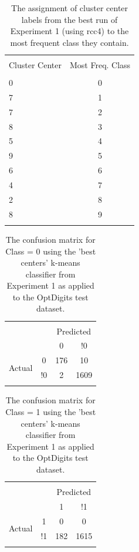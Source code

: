 \documentclass[12pt]{article}
\begin{document}
\begin{table} \centering 
  \caption{The assignment of cluster center labels from the best run of Experiment 1 (using rcc4) to the most frequent class they contain.} 
  \label{tab:a2} 
\begin{tabular}{lc} \\
[-1.8ex] \hline \hline \\[-1.8ex] 
 Cluster Center & Most Freq. Class \\ 
 \hline \\[-1.8ex]
0 & 0\\
7 & 1\\
7 & 2\\
8 & 3\\
5 & 4\\
9 & 5\\
6 & 6 \\
4 & 7\\
2 & 8\\
8 & 9\\
\hline \\[-1.8ex]
\end{tabular} 
\end{table}


\begin{table} \centering 
  \caption{The confusion matrix for Class = 0 using the 'best centers' k-means classifier from Experiment 1 as applied to the OptDigits test dataset.} 
  \label{tab:a3} 
\begin{tabular}{lccc} 
\\[-1.8ex]\hline 
\hline \\[-1.8ex] 
\multicolumn{2}{c}{} & \multicolumn{2}{c}{Predicted} \\
\multicolumn{2}{c}{} & 0 & !0\\
\multirow{2}{*}{Actual} & 0 & 176 & 10\\
& !0 & 2 & 1609\\
\hline \\[-1.8ex]
\end{tabular} 
\end{table}

\begin{table} \centering 
  \caption{The confusion matrix for Class = 1 using the 'best centers' k-means classifier from Experiment 1 as applied to the OptDigits test dataset.} 
  \label{tab:a4} 
\begin{tabular}{lccc} 
\\[-1.8ex]\hline 
\hline \\[-1.8ex] 
\multicolumn{2}{c}{} & \multicolumn{2}{c}{Predicted} \\
\multicolumn{2}{c}{} & 1 & !1\\
\multirow{2}{*}{Actual} & 1 & 0 & 0\\
& !1 & 182 & 1615\\
\hline \\[-1.8ex]
\end{tabular} 
\end{table}
\end{document}
